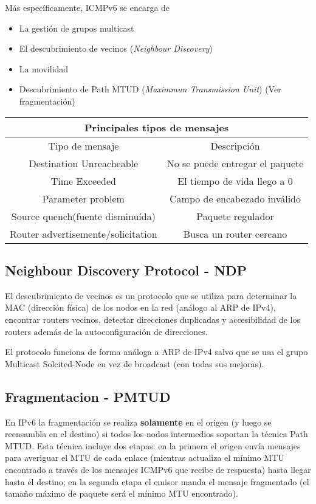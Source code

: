 \documentclass{book}
\begin{document}
	\vspace{3mm}
	Más específicamente, ICMPv6 se encarga de
	\begin{itemize}
		\item La gestión de grupos multicast
		\item El descubrimiento de vecinos (\textit{Neighbour Discovery})
		\item La movilidad
		\item Descubrimiento de Path MTUD (\textit{Maximmun Transmission Unit}) (Ver fragmentación)
	\end{itemize}
	
	\begin{table}[H]
		\centering
		\begin{tabular}{|c|c|}
			\hline
			\multicolumn{2}{|c|}{Principales tipos de mensajes}\\
			\hline
			Tipo de mensaje&Descripción\\
			\hline
			Destination Unreacheable&No se puede entregar el paquete\\
			\hline
			Time Exceeded&El tiempo de vida llego a 0\\
			\hline
			Parameter problem&Campo de encabezado inválido\\
			\hline
			Source quench(fuente disminuída)&Paquete regulador\\
			\hline
			Router advertisemente/solicitation&Busca un router cercano\\
			\hline
		\end{tabular}
	\end{table}
	
	\subsection{Neighbour Discovery Protocol - NDP}
	El descubrimiento de vecinos es un protocolo que se utiliza para determinar la MAC (dirección física) de los nodos en la red (análogo al ARP de IPv4), encontrar routers vecinos, detectar direcciones duplicadas y accesibilidad de los routers además de la autoconfiguración de direcciones.
	
	\vspace{3mm}
	El protocolo funciona de forma análoga a ARP de IPv4 salvo que se usa el grupo Multicast Solcited-Node en vez de broadcast (con todas sus mejoras).
	
	\subsection{Fragmentacion - PMTUD}
	En IPv6 la fragmentación se realiza \textbf{solamente} en el origen (y luego se reensambla en el destino) si todos los nodos intermedios soportan la técnica Path MTUD. Esta técnica incluye dos etapas: en la primera el origen envía mensajes para averiguar el MTU de cada enlace (mientras actualiza el mínimo MTU encontrado a través de los mensajes ICMPv6 que recibe de respuesta) hasta llegar hasta el destino; en la segunda etapa el emisor manda el mensaje fragmentado (el tamaño máximo de paquete será el mínimo MTU encontrado).
	
\end{document}

